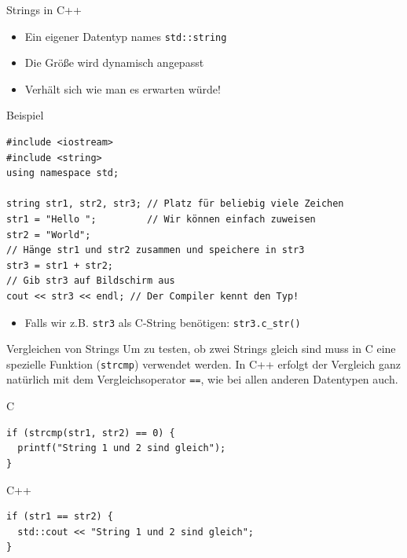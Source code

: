 \documentclass[presentation]{beamer}
\begin{document}
\begin{frame}[fragile,label={sec:org07fdfe0}]{Strings in C++}
 \begin{itemize}
\item Ein eigener Datentyp names {\color{solarizedYellow}\texttt{std::string}}
\item Die Größe wird dynamisch angepasst
\item Verhält sich wie man es erwarten würde!
\end{itemize}
\begin{exampleblock}{Beispiel}
\begin{verbatim}
#include <iostream>
#include <string>
using namespace std;

string str1, str2, str3; // Platz für beliebig viele Zeichen
str1 = "Hello ";         // Wir können einfach zuweisen
str2 = "World";
// Hänge str1 und str2 zusammen und speichere in str3
str3 = str1 + str2;
// Gib str3 auf Bildschirm aus
cout << str3 << endl; // Der Compiler kennt den Typ!
\end{verbatim}
\end{exampleblock}
\begin{itemize}
\item Falls wir z.B. {\color{solarizedYellow}\texttt{str3} }als C-String benötigen:  {\color{solarizedYellow}\texttt{str3.c\_str()}}
\end{itemize}
\end{frame}
\begin{frame}[fragile,label={sec:org5e95dc0}]{Vergleichen von Strings}
 Um zu testen, ob zwei Strings gleich sind muss in C eine spezielle
Funktion ({\color{solarizedYellow}\texttt{strcmp}}) verwendet werden. In C++ erfolgt der Vergleich
ganz natürlich mit dem Vergleichsoperator {\color{solarizedYellow}\texttt{==}}, wie bei allen anderen
Datentypen auch.
\begin{exampleblock}{C}
\begin{verbatim}
if (strcmp(str1, str2) == 0) {
  printf("String 1 und 2 sind gleich");
}
\end{verbatim}
\end{exampleblock}
\begin{exampleblock}{C++}
\begin{verbatim}
if (str1 == str2) {
  std::cout << "String 1 und 2 sind gleich";
}
\end{verbatim}
\end{exampleblock}
\end{frame}
\end{document}
